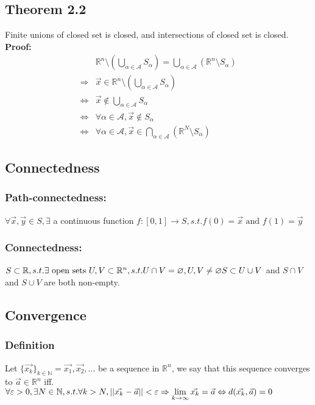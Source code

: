 \documentclass[11pt, a4paper]{article}
\begin{document}
    \subsection{Theorem 2.2}
    Finite unions of closed set is closed, and intersections of closed set is closed. \\
        \textbf{Proof:} 
        $$\begin{aligned}
            &\mathbb{R}^n \setminus (\bigcup\limits_{\alpha \in \mathscr{A}} S_\alpha) = \bigcup\limits_{\alpha \in \mathscr{A}} (\mathbb{R}^n \setminus S_\alpha) \\
            \Rightarrow& \vec{x} \in \mathbb{R}^n \setminus (\bigcup\limits_{\alpha \in \mathscr{A}} S_\alpha) \\
            \Leftrightarrow& \vec{x} \notin \bigcup\limits_{\alpha \in \mathscr{A}} S_\alpha \\
            \Leftrightarrow& \forall \alpha \in \mathscr{A}, \vec{x} \notin S_\alpha \\
            \Leftrightarrow& \forall \alpha \in \mathscr{A}, \vec{x} \in \bigcap\limits_{\alpha \in \mathscr{A}} (\mathbb{R}^N \setminus S_\alpha)
        \end{aligned}$$
    \subsection{Connectedness}
        \subsubsection{Path-connectedness:}
            $\forall \vec{x}, \vec{y} \in S, \exists$ a continuous function $f: [0, 1] \to S, s.t. f(0) = \vec{x} \text{ and } f(1) = \vec{y}$
        \subsubsection{Connectedness:}
        $S \subset \mathbb{R}, s.t. \exists \text{ open sets } U, V \subset \mathbb{R}^n, s.t. U \cap V = \varnothing, U, V \neq \varnothing \\
        S \subset U \cup V$ and $S \cap V$ and $S \cup V$ are both non-empty.
    \subsection{Convergence}
        \subsubsection{Definition}
            Let $\{\vec{x_k}\}_{k \in \mathbb{N}} = {\vec{x_1}, \vec{x_2}, ...}$ be a sequence in $\mathbb{R}^n$, we say that this sequence converges to $\vec{a} \in \mathbb{R}^n$ iff. $\forall \varepsilon > 0, \exists N \in \mathbb{N}, s.t. \forall k > N, ||\vec{x_k} - \vec{a}|| < \varepsilon \\
            \Rightarrow \lim\limits_{k \to \infty} \vec{x_k} = \vec{a} \Leftrightarrow d(\vec{x_k}, \vec{a}) = 0$
\end{document}
